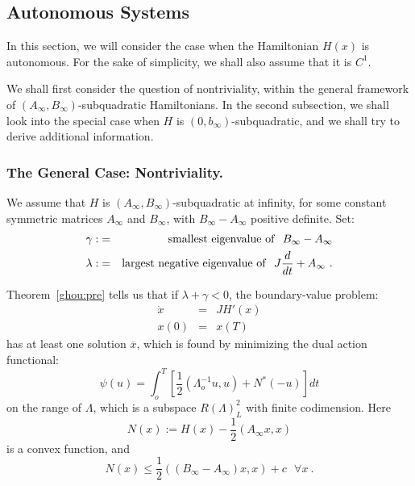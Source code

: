\documentclass[lnbip]{svmultln}
\begin{document}
%
\subsection{Autonomous Systems}
%
In this section, we will consider the case when the Hamiltonian $H(x)$
is autonomous. For the sake of simplicity, we shall also assume that it
is $C^{1}$.

We shall first consider the question of nontriviality, within the
general framework of
$\left(A_{\infty},B_{\infty}\right)$-subquadratic Hamiltonians. In
the second subsection, we shall look into the special case when $H$ is
$\left(0,b_{\infty}\right)$-subquadratic,
and we shall try to derive additional information.
%
\subsubsection{The General Case: Nontriviality.}
%
We assume that $H$ is
$\left(A_{\infty},B_{\infty}\right)$-sub\-qua\-dra\-tic at infinity,
for some constant symmetric matrices $A_{\infty}$ and $B_{\infty}$,
with $B_{\infty}-A_{\infty}$ positive definite. Set:
\begin{eqnarray}
\gamma :&=&{\rm smallest\ eigenvalue\ of}\ \ B_{\infty} - A_{\infty} \\
  \lambda : &=& {\rm largest\ negative\ eigenvalue\ of}\ \
  J \frac{d}{dt} +A_{\infty}\ .
\end{eqnarray}

Theorem~\ref{ghou:pre} tells us that if $\lambda +\gamma < 0$, the
boundary-value problem:
\begin{equation}
\begin{array}{rcl}
  \dot{x}&=&JH' (x)\\
  x(0)&=&x (T)
\end{array}
\end{equation}
has at least one solution
$\overline{x}$, which is found by minimizing the dual
action functional:
\begin{equation}
  \psi (u) = \int_{o}^{T} \left[\frac{1}{2}
  \left(\Lambda_{o}^{-1} u,u\right) + N^{\ast} (-u)\right] dt
\end{equation}
on the range of $\Lambda$, which is a subspace $R (\Lambda)_{L}^{2}$
with finite codimension. Here
\begin{equation}
  N(x) := H(x) - \frac{1}{2} \left(A_{\infty} x,x\right)
\end{equation}
is a convex function, and
\begin{equation}
  N(x) \le \frac{1}{2}
  \left(\left(B_{\infty} - A_{\infty}\right) x,x\right)
  + c\ \ \ \forall x\ .
\end{equation}
\end{document}

